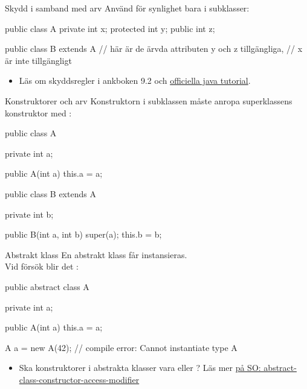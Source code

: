\documentclass{lecturenotes}
\begin{document}
\begin{Slide}{Skydd i samband med arv}
Använd  för synlighet bara i subklasser:
\begin{Code}
public class A {
    private int x;
    protected int y;
    public int z;
}
\end{Code}
\begin{Code}
public class B extends A {
    // här är de ärvda attributen y och z tillgängliga,
    // x är inte tillgängligt
}
\end{Code}
\begin{itemize}\footnotesize
\item Läs om skyddsregler i ankboken 9.2 och \href{https://docs.oracle.com/javase/tutorial/java/javaOO/accesscontrol.html}{officiella java tutorial}.
\end{itemize}
\end{Slide}

\begin{Slide}{Konstruktorer och arv}
Konstruktorn i subklassen måste  anropa superklassens konstruktor med :
\begin{Code}[numberstyle=]
public class A {
    private int a;
    
    public A(int a){
        this.a = a;
    }
}
\end{Code}
\begin{Code}
public class B extends A {
    private int b;
    
    public B(int a, int b){
        super(a);
        this.b = b;
    }
}
\end{Code}
\end{Slide}

\begin{Slide}{Abstrakt klass}
En abstrakt klass får  instansieras. \\ Vid försök blir det :
\begin{Code}[numberstyle=]
public abstract class A {
    private int a;
    
    public A(int a){
        this.a = a;
    }
}
\end{Code}
\begin{Code}
    A a = new A(42);  // compile error: Cannot instantiate type A
\end{Code}
\begin{itemize}\footnotesize
\item Ska konstruktorer i abstrakta klasser vara  eller ? Läs mer \href{http://stackoverflow.com/questions/260744/abstract-class-constructor-access-modifier}{på SO: abstract-class-constructor-access-modifier}
\end{itemize}
\end{Slide}
\end{document}
